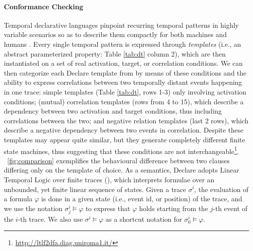 \paragraph*{Conformance Checking}\label{sec:DAD} Temporal declarative languages 
pinpoint recurring temporal patterns in highly variable scenarios so as to describe them compactly for both machines and humans \cite{PichlerWZPMR11}.
Every single temporal pattern is expressed through \textit{templates} (i.e., an abstract parameterized property: Table \ref{tab:dt} column 2), which are then instantiated on a set of real activation, target, or correlation conditions. We can then categorize each Declare template from \cite{Li2020} by means of these conditions and the ability to express correlations between two temporally distant events happening in one %
trace: %
simple
 templates (Table \ref{tab:dt}, rows 1-3) only involving activation conditions; (mutual)
 correlation templates (rows from 4 to 15), which describe a dependency between two
activation and target conditions, thus including correlations between the two; and negative relation templates (last 2 rows), which describe a negative
dependency between two events in correlation. %
Despite %
these templates may appear quite similar, but they generate completely different finite state machines, thus suggesting that these conditions are not interchangeable\footnote{\url{http://ltlf2dfa.diag.uniroma1.it/}}. 
\figurename~\ref{fig:comparison} exemplifies the behavioural difference between two clauses differing only on the template of choice.
As a semantics, %
Declare adopts %
Linear Temporal Logic over finite traces (\LTLf), which interprets formulae over an unbounded, yet finite linear sequence of states. %
Given a trace $\sigma^i$, the evaluation of a formula $\varphi$ is done in a given state (i.e., event id, or position) of the trace, and we use the notation $\sigma^i_j\vDash\varphi$ to express that $\varphi$ holds starting from the $j$-th event of the $i$-th trace. We also use $\sigma^i\vDash\varphi$ as a shortcut notation for $\sigma^i_0\vDash\varphi$.  %
